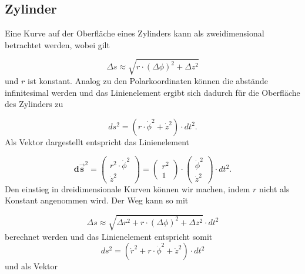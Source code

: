 %
%
%
%
\subsection{Zylinder\label{geodaeten:section:LinZylinder}}

Eine Kurve auf der Oberfläche eines Zylinders kann als zweidimensional betrachtet werden, wobei gilt

\begin{equation}
	\Delta s \approx \sqrt{r \cdot (\Delta \phi)^2 + \Delta z^2}
\end{equation}
und $r$ ist konstant.
Analog zu den Polarkoordinaten können die abstände infinitesimal werden und das Linienelement ergibt sich dadurch für die Oberfläche des Zylinders zu

\begin{equation}
	ds^2 = \left(r \cdot \dot{\phi}^2 +\dot{z}^2\right) \cdot dt^2 .
\end{equation}
Als Vektor dargestellt entspricht das Linienelement

\begin{equation}
	\mathbf{d\vec{s}}^2 = \begin{pmatrix} r^2 \cdot \dot{\phi}^2 \\ \dot{z}^2 \end{pmatrix} = \begin{pmatrix} r^2 \\ 1 \end{pmatrix} \cdot \begin{pmatrix} \dot{\phi}^2 \\ \dot{z}^2 \end{pmatrix} \cdot dt^2 .
\end{equation}
Den einstieg in dreidimensionale Kurven können wir machen, indem $r$ nicht als Konstant angenommen wird.
Der Weg kann so mit

\begin{equation}
	\Delta s \approx \sqrt{\Delta r^2 + r \cdot (\Delta \phi)^2 + \Delta z^2} \cdot dt^2
\end{equation}
berechnet werden und das Linienelement entspricht somit
\begin{equation}
	ds^2 = \left(\dot{r}^2 + r \cdot \dot{\phi}^2 +\dot{z}^2\right) \cdot dt^2
\end{equation}
und als Vektor

